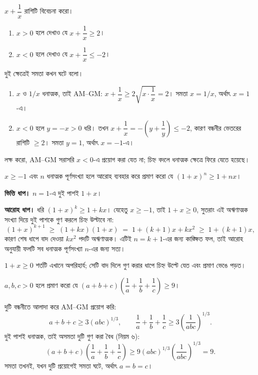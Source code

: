 \documentclass[11pt]{article}
\begin{document}
 $x + \dfrac{1}{x}$ রাশিটি বিবেচনা করো।
\begin{enumerate}
  \item $x > 0$ হলে দেখাও যে $x + \dfrac{1}{x} \geq 2$।
  \item $x < 0$ হলে দেখাও যে $x + \dfrac{1}{x} \leq -2$।
\end{enumerate}
দুই ক্ষেত্রেই সমতা কখন ঘটে বলো।

\begin{sol}
\begin{enumerate}
  \item $x$ ও $1/x$ ধনাত্মক, তাই AM--GM: $x + \dfrac{1}{x} \geq 2\sqrt{x \cdot
        \dfrac{1}{x}} = 2$। সমতা $x = 1/x$, অর্থাৎ $x = 1$-এ।
  \item $x < 0$ হলে $y = -x > 0$ ধরি। তখন
        $x + \dfrac{1}{x} = -\left( y + \dfrac{1}{y} \right) \leq -2$,
        কারণ বন্ধনীর ভেতরের রাশিটি $\geq 2$। সমতা $y = 1$, অর্থাৎ $x = -1$-এ।
\end{enumerate}
লক্ষ করো, AM--GM সরাসরি $x < 0$-এ প্রয়োগ করা যেত না; চিহ্ন বদলে ধনাত্মক
ক্ষেত্রে ফিরে যেতে হয়েছে।
\end{sol}

 $x \geq -1$ এবং $n$ ধনাত্মক পূর্ণসংখ্যা হলে আরোহ ব্যবহার করে প্রমাণ
করো যে $(1+x)^n \geq 1 + nx$।

\begin{sol}
\textbf{ভিত্তি ধাপ।} $n = 1$-এ দুই পাশই $1+x$।

\textbf{আরোহ ধাপ।} ধরি $(1+x)^k \geq 1 + kx$। যেহেতু $x \geq -1$, তাই
$1 + x \geq 0$, সুতরাং এই অঋণাত্মক সংখ্যা দিয়ে দুই পাশকে গুণ করলে চিহ্ন
উল্টাবে না:
\[
  (1+x)^{k+1} \;\geq\; (1+kx)(1+x) \;=\; 1 + (k+1)x + kx^2 \;\geq\; 1 + (k+1)x ,
\]
কারণ শেষ ধাপে বাদ দেওয়া $kx^2$ পদটি অঋণাত্মক। এটিই $n = k+1$-এর জন্য কাঙ্ক্ষিত
ফল, তাই আরোহ অনুযায়ী ফলটি সব ধনাত্মক পূর্ণসংখ্যা $n$-এর জন্য সত্য।

$1 + x \geq 0$ শর্তটি এখানে অপরিহার্য; সেটি বাদ দিলে গুণ করার ধাপে চিহ্ন উল্টে
যেত এবং প্রমাণ ভেঙে পড়ত।
\end{sol}

 $a, b, c > 0$ হলে প্রমাণ করো যে
$(a+b+c)\left( \dfrac{1}{a} + \dfrac{1}{b} + \dfrac{1}{c} \right) \geq 9$।

\begin{sol}
দুটি বন্ধনীতে আলাদা করে AM--GM প্রয়োগ করি:
\[
  a+b+c \geq 3(abc)^{1/3}, \qquad
  \frac{1}{a} + \frac{1}{b} + \frac{1}{c} \geq 3 \left( \frac{1}{abc} \right)^{1/3} .
\]
দুই পাশই ধনাত্মক, তাই অসমতা দুটি গুণ করা বৈধ (নিয়ম ৬):
\[
  (a+b+c)\left( \frac{1}{a} + \frac{1}{b} + \frac{1}{c} \right)
  \geq 9 (abc)^{1/3} \left( \frac{1}{abc} \right)^{1/3} = 9 .
\]
সমতা তখনই, যখন দুটি প্রয়োগেই সমতা ঘটে, অর্থাৎ $a = b = c$।
\end{sol}
\end{document}

